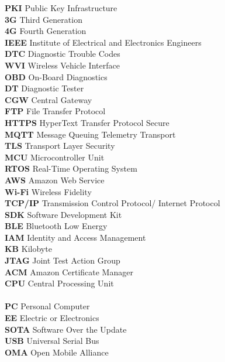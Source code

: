 \documentclass[12pt,a4paper]{article}
\newenvironment{sftabbing}[1][1]
  {\par\sffamily#1\tabbing}
  {\endtabbing}
\begin{document}
\begin{sftabbing}[\small]
\textbf{PKI} \> Public Key Infrastructure\> \\
\textbf{3G} \> Third Generation\> \\
\textbf{4G} \> Fourth Generation\> \\
\textbf{IEEE} \> Institute of Electrical and Electronics Engineers\> \\
\textbf{DTC} \> Diagnostic Trouble Codes\> \\
\textbf{WVI} \> Wireless Vehicle Interface\> \\
\textbf{OBD} \> On-Board Diagnostics\> \\
\textbf{DT} \> Diagnostic Tester\> \\
\textbf{CGW} \> Central Gateway\> \\
\textbf{FTP} \> File Transfer Protocol\> \\
\textbf{HTTPS} \> HyperText Transfer Protocol Secure\> \\
\textbf{MQTT} \> Message Queuing Telemetry Transport\> \\
\textbf{TLS} \> Transport Layer Security\> \\
\textbf{MCU} \> Microcontroller Unit\> \\
\textbf{RTOS} \> Real-Time Operating System\> \\
\textbf{AWS} \> Amazon Web Service\> \\
\textbf{Wi-Fi} \> Wireless Fidelity\> \\
\textbf{TCP/IP} \> Transmission Control Protocol/ Internet Protocol\> \\
\textbf{SDK} \> Software Development Kit\> \\
\textbf{BLE} \> Bluetooth Low Energy\> \\
\textbf{IAM} \> Identity and Access Management\> \\
\textbf{KB} \> Kilobyte\> \\
\textbf{JTAG} \> Joint Test Action Group\> \\
\textbf{ACM} \> Amazon Certificate Manager\> \\
\textbf{CPU} \> Central Processing Unit\> \\\\
\textbf{PC} \> Personal Computer\> \\
\textbf{EE} \> Electric or Electronics\> \\
\textbf{SOTA} \> Software Over the Update\> \\
\textbf{USB} \> Universal Serial Bus\> \\
\textbf{OMA} \> Open Mobile Alliance\> \\

\end{sftabbing}
\end{document}
